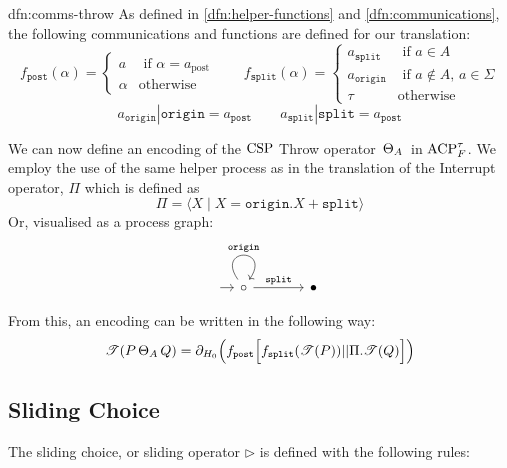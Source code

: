 \documentclass[../hons_project.tex]{subfiles}
\begin{document}
\begin{dfn}{dfn:comms-throw}{}
	As defined in \ref{dfn:helper-functions} and \ref{dfn:communications}, the following communications and functions are defined for our translation:
	\[f_{\mathtt{post}}(\alpha) = \begin{cases}
			a      & \text{ if } \alpha = a_{\mathrm{post}} \\
			\alpha & \text{otherwise}
		\end{cases} \qquad f_{\mathtt{split}}(\alpha) = \begin{cases}
				      a_{\mathtt{split}}  & \text{ if } a\in A                    \\
				      a_{\mathtt{origin}} & \text{ if } a\not\in A,\, a\in \Sigma \\
				      \tau                & \mathrm{otherwise}
			      \end{cases}\]
	\[a_{\mathtt{origin}} | \mathtt{origin} = a_{\mathtt{post}} \qquad a_{\mathtt{split}} | \mathtt{split} = a_{\mathtt{post}}\]
\end{dfn}

We can now define an encoding of the $\mathrm{CSP}$ Throw operator $\,\Theta_{A}\,$ in $\mathrm{ACP}_{F}^{\tau}$. We employ the use of the same helper process as in the translation of the Interrupt operator, $\Pi$ which is defined as
\[\Pi = \langle X \mid X = \mathtt{origin}.X + \mathtt{split} \rangle\]
Or, visualised as a process graph:
\[\begin{tikzcd}[column sep=scriptsize, row sep=scriptsize]
		{} & \circ && \bullet
		\arrow[shorten <=8pt, from=1-1, to=1-2]
		\arrow["{\mathtt{origin}}", from=1-2, to=1-2, loop, in=55, out=125, distance=10mm]
		\arrow["{\mathtt{split}}", from=1-2, to=1-4]
	\end{tikzcd}\]

From this, an encoding can be written in the following way:
\[\mathscr{T}(P \,\Theta_{A}\, Q) = \partial_{H_{0}}\Bigl(f_{\mathtt{post}}\Bigl[ f_{\mathtt{split}}(\mathscr{T}(P)) | | \Pi.\mathscr{T}(Q) \Bigr]\Bigr)\]


\subsection{Sliding Choice}\label{ssec:sliding-choice}
The sliding choice, or sliding operator $\triangleright$ is defined with the following rules:
\end{document}
